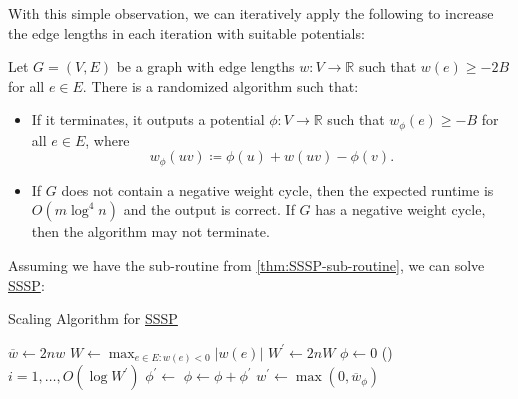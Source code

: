 With this simple observation, we can iteratively apply the following to increase the edge lengths in each iteration with suitable potentials:

\begin{theorem}\label{thm:SSSP-sub-routine}
	Let \(G = (V, E)\) be a graph with edge lengths \(w\colon V \to \mathbb{R} \) such that \(w(e) \geq -2B\) for all \(e \in E\). There is a randomized algorithm such that:
	\begin{itemize}
		\item If it terminates, it outputs a potential \(\phi \colon V \to \mathbb{R} \) such that \(w_{\phi }(e) \geq -B\) for all \(e \in E\), where
		      \[
			      w_{\phi }(uv)
			      \coloneqq \phi (u) + w(uv) - \phi (v).
		      \]
		\item If \(G\) does not contain a negative weight cycle, then the expected runtime is \(O(m \log ^4 n)\) and the output is correct. If \(G\) has a negative weight cycle, then the algorithm may not terminate.
	\end{itemize}
\end{theorem}

Assuming we have the sub-routine from \autoref{thm:SSSP-sub-routine}, we can solve \hyperref[prb:SSSP]{SSSP}:

\begin{algorithm}[H]\label{algo:SSSP-scaling}
	\DontPrintSemicolon{}
	\caption{Scaling Algorithm for \hyperref[prb:SSSP]{SSSP}}

	\BlankLine

	\(\overline{w} \gets 2n w\)\;
	\(W \gets \max _{e \in E \colon w(e) < 0} \lvert w(e) \rvert \)\;
	\(W^{\prime} \gets 2n W\)\;
	\(\phi \gets 0\)
	\;
	\For(){\(i = 1, \dots , O(\log W^{\prime} )\)}{
		\(\phi ^{\prime} \gets \)\;
		\(\phi \gets \phi + \phi ^{\prime} \)
	}
	\;
	\(w^{\prime} \gets \max (0, \overline{w} _\phi )\)\;
	\;
\end{algorithm}

